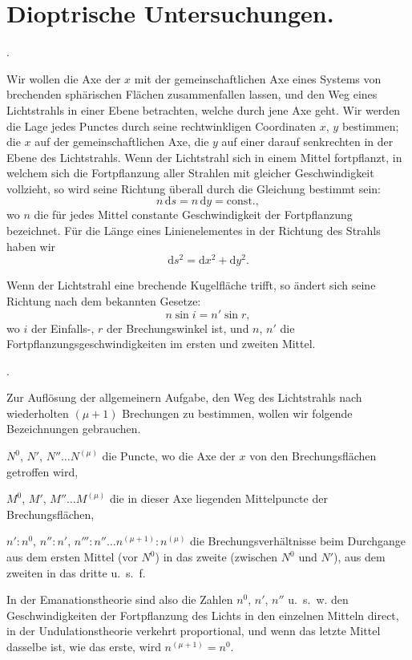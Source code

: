 \documentclass[11pt,a4paper]{article}
\begin{document}
\section*{Dioptrische Untersuchungen.}

\bigskip{}.

\smallskip
Wir wollen die Axe der $x$ mit der gemeinschaftlichen Axe eines Systems von brechenden sphärischen Flächen zusammenfallen lassen, und den Weg eines Lichtstrahls in einer Ebene betrachten, welche durch jene Axe geht. Wir werden die Lage jedes Punctes durch seine rechtwinkligen Coordinaten $x$, $y$ bestimmen; die $x$ auf der gemeinschaftlichen Axe, die $y$ auf einer darauf senkrechten in der Ebene des Lichtstrahls. Wenn der Lichtstrahl sich in einem Mittel fortpflanzt, in welchem sich die Fortpflanzung aller Strahlen mit gleicher Geschwindigkeit vollzieht, so wird seine Richtung überall durch die Gleichung bestimmt sein:
\[
n\,\mathrm{d}s = n\,\mathrm{d}y = \text{const.},
\]
wo $n$ die für jedes Mittel constante Geschwindigkeit der Fortpflanzung bezeichnet. Für die Länge eines Linienelementes in der Richtung des Strahls haben wir
\[
\mathrm{d}s^2 = \mathrm{d}x^2 + \mathrm{d}y^2.
\]

Wenn der Lichtstrahl eine brechende Kugelfläche trifft, so ändert sich seine Richtung nach dem bekannten Gesetze:
\[
n \sin i = n' \sin r,
\]
wo $i$ der Einfalls-, $r$ der Brechungswinkel ist, und $n$, $n'$ die Fortpflanzungsgeschwindigkeiten im ersten und zweiten Mittel.

\bigskip{}.

\smallskip
Zur Auflösung der allgemeinern Aufgabe, den Weg des Lichtstrahls nach wiederholten $(\mu + 1)$ Brechungen zu bestimmen, wollen wir folgende Bezeichnungen gebrauchen.

$N^0$, $N'$, $N'' \ldots N^{(\mu)}$ die Puncte, wo die Axe der $x$ von den Brechungsflächen getroffen wird,

$M^0$, $M'$, $M'' \ldots M^{(\mu)}$ die in dieser Axe liegenden Mittelpuncte der Brechungsflächen,

$n' : n^0$, $n'' : n'$, $n''' : n'' \ldots n^{(\mu+1)} : n^{(\mu)}$ die Brechungsverhältnisse beim Durchgange aus dem ersten Mittel (vor $N^0$) in das zweite (zwischen $N^0$ und $N'$), aus dem zweiten in das dritte u.~s.~f.

In der Emanationstheorie sind also die Zahlen $n^0$, $n'$, $n''$ u.~s.~w. den Geschwindigkeiten der Fortpflanzung des Lichts in den einzelnen Mitteln direct, in der Undulationstheorie verkehrt proportional, und wenn das letzte Mittel dasselbe ist, wie das erste, wird $n^{(\mu+1)} = n^0$.
\end{document}
